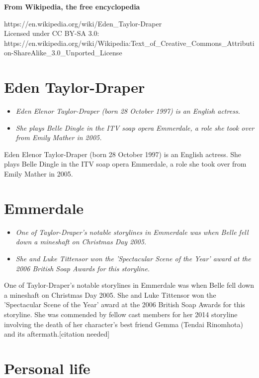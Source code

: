 \textbf{From Wikipedia, the free encyclopedia}

https://en.wikipedia.org/wiki/Eden\_Taylor-Draper\\
Licensed under CC BY-SA 3.0:\\
https://en.wikipedia.org/wiki/Wikipedia:Text\_of\_Creative\_Commons\_Attribution-ShareAlike\_3.0\_Unported\_License

\section{Eden Taylor-Draper}\label{eden-taylor-draper}

\begin{itemize}
\item
  \emph{Eden Elenor Taylor-Draper (born 28 October 1997) is an English
  actress.}
\item
  \emph{She plays Belle Dingle in the ITV soap opera Emmerdale, a role
  she took over from Emily Mather in 2005.}
\end{itemize}

Eden Elenor Taylor-Draper (born 28 October 1997) is an English actress.
She plays Belle Dingle in the ITV soap opera Emmerdale, a role she took
over from Emily Mather in 2005.

\section{Emmerdale}\label{emmerdale}

\begin{itemize}
\item
  \emph{One of Taylor-Draper's notable storylines in Emmerdale was when
  Belle fell down a mineshaft on Christmas Day 2005.}
\item
  \emph{She and Luke Tittensor won the 'Spectacular Scene of the Year'
  award at the 2006 British Soap Awards for this storyline.}
\end{itemize}

One of Taylor-Draper's notable storylines in Emmerdale was when Belle
fell down a mineshaft on Christmas Day 2005. She and Luke Tittensor won
the 'Spectacular Scene of the Year' award at the 2006 British Soap
Awards for this storyline. She was commended by fellow cast members for
her 2014 storyline involving the death of her character's best friend
Gemma (Tendai Rinomhota) and its aftermath.{[}citation needed{]}

\section{Personal life}\label{personal-life}

